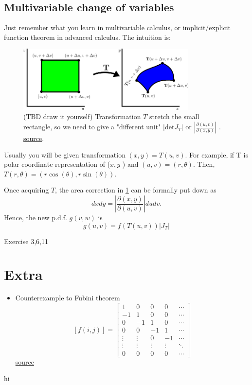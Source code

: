 \subsection{Multivariable change of variables}
Just remember what you learn in multivariable calculus, or implicit/explicit function theorem in advanced calculus. 
The intuition is: 
\begin{figure}[h]
    \centering
    \includegraphics[width=0.8\textwidth]{./Figures/CoV.png}
    \caption{\label{fig:CoV_Jacobian}(TBD draw it yourself) Transformation \(T\) stretch the small rectangle, so we need to give a "different unit"  \(|\text{det}J_T|\) or \(\left|\frac{\partial (u,v)}{\partial (x,y)} \right|\) . \href{https://mathinsight.org/image/change_variable_area_transformation}{source}. }
\end{figure}

Usually you will be given transformation  \((x,y) = T(u,v) \). For example, if T is polar coordinate representation of (\(x,y\) ) and \((u,v) = (r,\theta )\). Then,  \(T(r,\theta ) = (r\cos(\theta ), r\sin(\theta ))\). 

Once acquiring \(T\), the area correction in \ref{fig:CoV_Jacobian} can be formally put down as
$$
dxdy = \left|\frac{\partial (x,y)}{\partial (u,v)} \right| dudv .
$$ 
Hence, the new p.d.f. \(g(v,w) \) is
\[
    g(u,v) = f(T(u,v)) \left| J_T \right|
\]  
\begin{exercise}
    Exercise 3,6,11
\end{exercise}

\section*{Extra}
\begin{itemize}
    \item Counterexample to Fubini theorem \\ 
    \[
        [f(i,j)]=\begin{bmatrix}1&0&0&0&\cdots
\\ -1&1&0&0&\cdots
\\0&-1&1&0&\cdots
\\0&0&-1&1&\cdots
\\\vdots&\vdots&0&-1&\cdots
\\\vdots&\vdots&\vdots&\vdots&\ddots
\\0&0&0&0&\cdots
\end{bmatrix}
    \] 
    \href{https://math.stackexchange.com/questions/3566631/counterexample-in-fubinis-theorem-non-integrable-function}{source}
\end{itemize}
hi